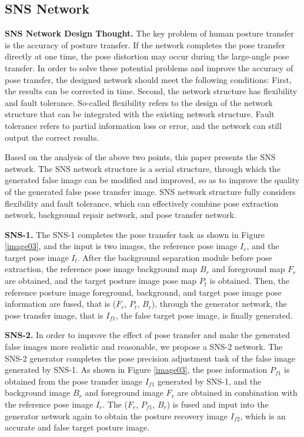 \subsection{SNS Network}
	
\textbf{SNS Network Design Thought.} The key problem of human posture transfer is the accuracy of posture transfer. If the network completes the pose transfer directly at one time, the pose distortion may occur during the large-angle pose transfer. In order to solve these potential problems and improve the accuracy of pose transfer, the designed network should meet the following conditions: First, the results can be corrected in time. Second, the network structure has flexibility and fault tolerance. So-called flexibility refers to the design of the network structure that can be integrated with the existing network structure. Fault tolerance refers to partial information loss or error, and the network can still output the correct results.
	
Based on the analysis of the above two points, this paper presents the SNS network. The SNS network structure is a serial structure, through which the generated false image can be modified and improved, so as to improve the quality of the generated false pose transfer image. SNS network structure fully considers flexibility and fault tolerance, which can effectively combine pose extraction network, background repair network, and pose transfer network.

\textbf{SNS-1.} The SNS-1 completes the pose transfer task as shown in Figure \ref{image03}, and the input is two images, the reference pose image $I_{r}$, and the target pose image $I_{t}$. After the background separation module before pose extraction, the reference pose image background map $B_{r}$ and foreground map $F_{r}$ are obtained, and the target posture image pose map $P_{t}$ is obtained. Then, the reference posture image foreground, background, and target pose image pose information are fused, that is ($F_{r}$, $P_{t}$, $B_{r}$), through the generator network, the pose transfer image, that is $I_{f1}$, the false target pose image, is finally generated.
	
\textbf{SNS-2.} In order to improve the effect of pose transfer and make the generated false images more realistic and reasonable, we propose a SNS-2 network. The SNS-2 generator completes the pose precision adjustment task of the false image generated by SNS-1. As shown in Figure \ref{image03}, the pose information $P_{f1}$ is obtained from the pose transfer image $I_{f1}$ generated by SNS-1, and the background image $B_{r}$ and foreground image $F_{r}$ are obtained in combination with the reference pose image $I_{r}$. The ($F_{r}$, $P_{f1}$, $B_{r}$) is fused and input into the generator network again to obtain the posture recovery image $I_{f2}$, which is an accurate and false target posture image.
	
